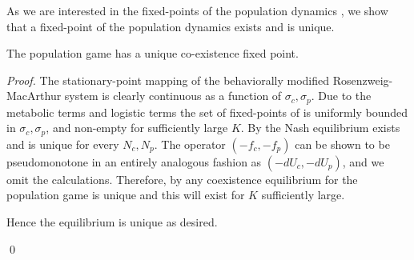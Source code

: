 As we are interested in the fixed-points of the population dynamics , we show that a fixed-point of the population dynamics exists and is unique.
\begin{theorem}
  The population game  has a unique co-existence fixed point.
\end{theorem}
\begin{proof}
The stationary-point mapping of the behaviorally modified Rosenzweig-MacArthur system is clearly continuous as a function of $\sigma_c,\sigma_p$. Due to the metabolic terms and logistic terms the set of fixed-points of is uniformly bounded in $\sigma_c, \sigma_p$, and non-empty for sufficiently large $K$. By  the Nash equilibrium exists and is unique for every $N_c, N_p$. The operator $(-f_c, -f_p)$ can be shown to be pseudomonotone in an entirely analogous fashion as $(-dU_c, -dU_p)$, and we omit the calculations. Therefore, by  any coexistence equilibrium for the population game is unique and this will exist for $K$ sufficiently large.
\begin{comment}
For the stability, remark that the fixed point is the only place where the Nash equilibrium leads to zero pr. capita growth rates $(f_c, f_p)$, and that the pr. capita growth rates are dominated by the monomorphic equivalent payoff-functions $U_c^{mon}, U_p^{mon}$. As we maximize the payoff-functions at every point $(N_c,N_p)$, a decrease in the maximal value of the payoff-function will also lead to a decrease in the growth rate.
Increasing $N_c$ and keeping $N_p^*$ fixed will lead to the maximal value of $U_c$ strictly decreasing, while the maximal value of $U_p$ will strictly increase, hence the value at the Nash equilibrium will weakly increase. Hence, as long as the population $N_p^*$ is less than $\frac{1}{\beta_0 + \exp{-3^2}}$

 Correspondingly, an increase in $N_p$ and keeping $N_c^*$ fixed will decrease the maximal value of $U_c^{mon}$ and $U_p^{mon}$, forcing $f_c$ and $f_p$ to become negative. Increasing both will also cause both to become negative. If we only increase $N_c$ and decrease $N_p$, then the situation is more complicated. At very low values of $N_p$ and $N_c$ less than the maximum for logistic growth, both $f_c$ and $f_p$ will become positive as we are nearly in the situation with logistic growth. As we we either pass the threshold for the stable point in the logistic growth, or $N_p$ becomes sufficiently large, the signs of both reverse.
Therefore any flow will eventually end up above $(N_c^*,N_p^*)$, where it will be attracted to the fixed point.

Hence the system is stable, and the equilibirum is unique as desired.
\end{comment}
Hence the equilibrium is unique as desired.

\qed
\end{proof}
